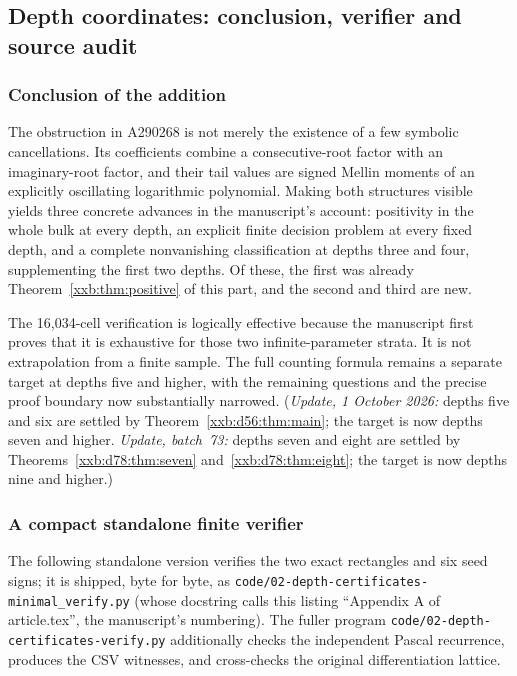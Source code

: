 \documentclass[11pt,a4paper]{article}
\numberwithin{equation}{section}
\theoremstyle{definition}
\theoremstyle{remark}
\theoremstyle{plain}
\begin{document}
\subsection{Depth coordinates: conclusion, verifier and source audit}\label{xxb:dc:sec:conclusion}

\subsubsection{Conclusion of the addition}
The obstruction in A290268 is not merely the existence of a few symbolic
cancellations.  Its coefficients combine a consecutive-root factor with
an imaginary-root factor, and their tail values are signed Mellin
moments of an explicitly oscillating logarithmic polynomial.  Making both
structures visible yields three concrete advances in the manuscript's
account: positivity in the whole bulk at every depth, an explicit finite
decision problem at every fixed depth, and a complete nonvanishing
classification at depths three and four, supplementing the first two depths.
Of these, the first was already Theorem~\ref{xxb:thm:positive} of this part,
and the second and third are new.

The 16,034-cell verification is logically effective because the manuscript
first proves that it is exhaustive for those two infinite-parameter
strata.  It is not extrapolation from a finite sample.  The full counting
formula remains a separate target at depths five and higher, with the
remaining questions and the precise proof boundary now substantially
narrowed.  (\emph{Update, 1 October 2026:} depths five and six are settled by
Theorem~\ref{xxb:d56:thm:main}; the target is now depths seven and higher.
\emph{Update, batch~73:} depths seven and eight are settled by
Theorems~\ref{xxb:d78:thm:seven} and~\ref{xxb:d78:thm:eight}; the target is
now depths nine and higher.)

\subsubsection{A compact standalone finite verifier}\label{xxb:dc:sec:verifier}
The following standalone version verifies the two exact rectangles and six seed
signs; it is shipped, byte for byte, as
\texttt{code/02-depth-\allowbreak certificates-\allowbreak minimal\_verify.py} (whose docstring calls
this listing ``Appendix A of article.tex'', the manuscript's numbering).  The
fuller program \texttt{code/02-depth-\allowbreak certificates-\allowbreak verify.py} additionally
checks the independent Pascal recurrence, produces the CSV witnesses, and
cross-checks the original differentiation lattice.
\end{document}

